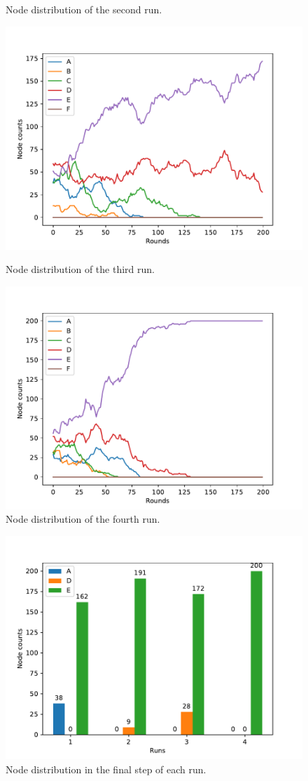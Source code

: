 \documentclass[11pt]{article}
\begin{document}
\begin{figure}[ht]
\begin{minipage}[b]{0.5\linewidth}
    \caption{Node distribution of the second run.}
  \end{minipage} 
  \begin{minipage}[b]{0.5\linewidth}
    \centering
    \includegraphics[width=0.9\linewidth]{results/03/run-3/distribution} 
	\caption{Node distribution of the third run.}
  \end{minipage}%
  \begin{minipage}[b]{0.5\linewidth}
    \centering
    \includegraphics[width=0.9\linewidth]{results/03/run-4/distribution} 
	\caption{Node distribution of the fourth run.}
  \end{minipage} 
\end{figure}

\begin{figure}[h]
	\centering
	\includegraphics[width=0.5\linewidth]{results/03/distribution} 
	\caption{Node distribution in the final step of each run.}
\end{figure}
\end{document}
